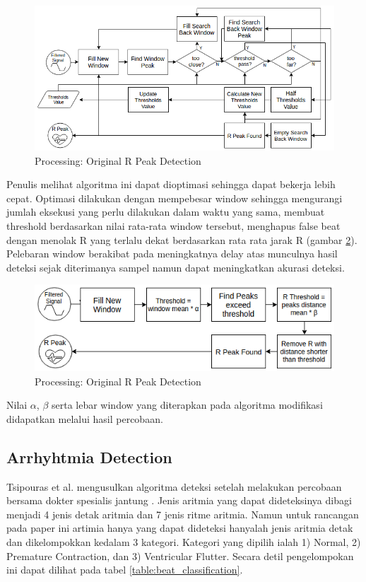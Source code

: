 \documentclass[conference]{IEEEtran}
\begin{document}
\begin{figure}[htbp]
\centerline{\includegraphics[scale=0.35]{images/processing_ori.png}}
\caption{Processing: Original R Peak Detection}
\label{fig:processing_ori}
\end{figure}

Penulis melihat algoritma ini dapat dioptimasi sehingga dapat bekerja lebih cepat. Optimasi dilakukan dengan mempebesar window sehingga mengurangi jumlah eksekusi yang perlu dilakukan dalam waktu yang sama, membuat threshold berdasarkan nilai rata-rata window tersebut, menghapus false beat dengan menolak R yang terlalu dekat berdasarkan rata rata jarak R (gambar \ref{fig:processing_modif}). Pelebaran window berakibat pada meningkatnya delay atas munculnya hasil deteksi sejak diterimanya sampel namun dapat meningkatkan akurasi deteksi.

\begin{figure}[htbp]
\centerline{\includegraphics[scale=0.45]{images/processing_modif.png}}
\caption{Processing: Original R Peak Detection}
\label{fig:processing_modif}
\end{figure}

Nilai $\alpha$, $\beta$ serta lebar window yang diterapkan pada algoritma modifikasi didapatkan melalui hasil percobaan.

\subsection{Arrhyhtmia Detection}
Tsipouras et al. mengusulkan algoritma deteksi setelah melakukan percobaan bersama dokter spesialis jantung \cite{tsipouras}. Jenis aritmia yang dapat dideteksinya dibagi menjadi 4 jenis detak aritmia dan 7 jenis ritme aritmia. Namun untuk rancangan pada paper ini artimia hanya yang dapat dideteksi hanyalah jenis aritmia detak dan dikelompokkan kedalam 3 kategori. Kategori yang dipilih ialah 1) Normal, 2) Premature Contraction, dan 3) Ventricular Flutter. Secara detil pengelompokan ini dapat dilihat pada tabel \ref{table:beat_classification}.
\end{document}
